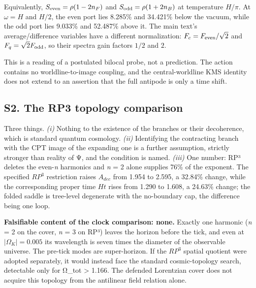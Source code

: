 \documentclass[
]{article}
\newcounter{none} %
\begin{document}
Equivalently, \(S_{\rm even}=\rho(1-2n_F)\) and
\(S_{\rm odd}=\rho(1+2n_B)\) at temperature \(H/\pi\). At \(\omega=H\)
and \(H/2\), the even port lies 8.285\% and 34.421\% below the vacuum,
while the odd port lies 9.033\% and 52.487\% above it. The main text's
average/difference variables have a different normalization:
\(F_c=F_{\rm even}/\sqrt2\) and \(F_q=\sqrt2F_{\rm odd}\), so their
spectra gain factors \(1/2\) and \(2\).

This is a reading of a postulated bilocal probe, not a prediction. The
action contains no worldline-to-image coupling, and the
central-worldline KMS identity does not extend to an assertion that the
full antipode is only a time shift.

\subsection{S2. The RP3 topology
comparison}\label{s2.-the-rp3-topology-comparison}

Three things. \emph{(i)} Nothing to the existence of the branches or
their decoherence, which is standard quantum cosmology. \emph{(ii)}
Identifying the contracting branch with the CPT image of the expanding
one is a further assumption, strictly stronger than reality of Ψ, and
the condition is named. \emph{(iii)} One number: RP³ deletes the
even-\emph{n} harmonics and \emph{n} = 2 alone supplies 76\% of the
exponent. The specified \(RP^3\) restriction raises \(A_{dec}\) from
1.954 to 2.595, a 32.84\% change, while the corresponding proper time
\(Ht\) rises from 1.290 to 1.608, a 24.63\% change; the folded saddle is
tree-level degenerate with the no-boundary cap, the difference being one
loop.

\textbf{Falsifiable content of the clock comparison: none.} Exactly one
harmonic (\emph{n} = 2 on the cover, \emph{n} = 3 on RP³) leaves the
horizon before the tick, and even at \(|\Omega_K|=0.005\) its wavelength
is seven times the diameter of the observable universe. The pre-tick
modes are super-horizon. If the \(RP^3\) spatial quotient were adopted
separately, it would instead face the standard cosmic-topology search,
detectable only for Ω\_tot \textgreater{} 1.166. The defended Lorentzian
cover does not acquire this topology from the antilinear field relation
alone.
\end{document}
